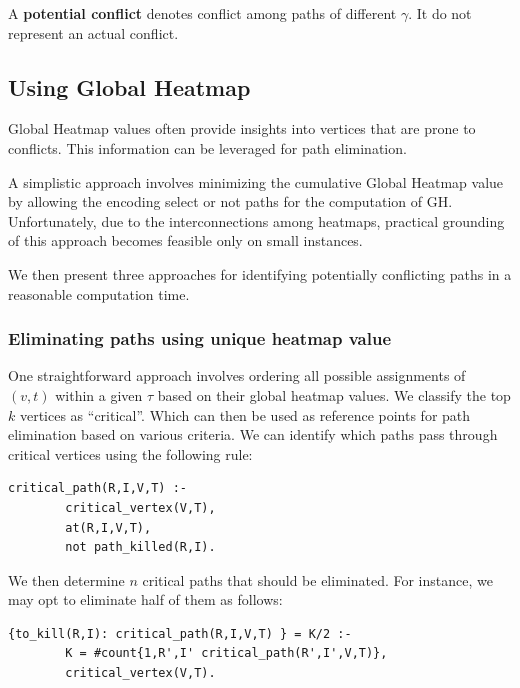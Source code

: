 \begin{definition}
    A \textbf{potential conflict} denotes conflict among paths of different \(\gamma\). It do not represent an actual conflict.
\end{definition}



\subsection{Using Global Heatmap}

Global Heatmap values often provide insights into vertices that are prone to conflicts. This information can be leveraged for path elimination. 

A simplistic approach involves minimizing the cumulative Global Heatmap value by allowing the encoding select or not paths for the computation of GH. Unfortunately, due to the interconnections among heatmaps, practical grounding of this approach becomes feasible only on small instances.

We then present three approaches for identifying potentially conflicting paths in a reasonable computation time.

\subsubsection{Eliminating paths using unique heatmap value}

One straightforward approach involves ordering all possible assignments of \((v, t)\) within a given \(\tau\) based on their global heatmap values. We classify the top \(k\) vertices as ``critical''. Which can then be used as reference points for path elimination based on various criteria. We can identify which paths pass through critical vertices using the following rule:

\begin{minipage}[H]{\linewidth}
\begin{lstlisting}[style=mystyle]
    critical_path(R,I,V,T) :- 
        critical_vertex(V,T), 
        at(R,I,V,T), 
        not path_killed(R,I).
\end{lstlisting}
\end{minipage}


We then determine \(n\) critical paths that should be eliminated. For instance, we may opt to eliminate half of them as follows:

\begin{minipage}[H]{\linewidth}
\begin{lstlisting}[style=mystyle]
    {to_kill(R,I): critical_path(R,I,V,T) } = K/2 :-
        K = #count{1,R',I' critical_path(R',I',V,T)},
        critical_vertex(V,T).
\end{lstlisting}
\end{minipage}

